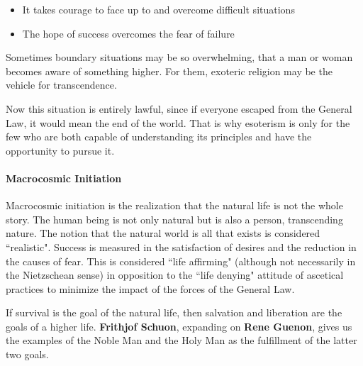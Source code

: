 \begin{itemize}
\item It takes courage to face up to and overcome difficult situations 
\item The hope of success overcomes the fear of failure 
\end{itemize}
Sometimes boundary situations may be so overwhelming, that a man or woman becomes aware of something higher. For them, exoteric religion may be the vehicle for transcendence.

Now this situation is entirely lawful, since if everyone escaped from the General Law, it would mean the end of the world. That is why esoterism is only for the few who are both capable of understanding its principles and have the opportunity to pursue it.

\paragraph{Macrocosmic Initiation}
Macrocosmic initiation is the realization that the natural life is not the whole story. The human being is not only natural but is also a person, transcending nature. The notion that the natural world is all that exists is considered ``realistic". Success is measured in the satisfaction of desires and the reduction in the causes of fear. This is considered ``life affirming" (although not necessarily in the Nietzschean sense) in opposition to the ``life denying" attitude of ascetical practices to minimize the impact of the forces of the General Law.

If survival is the goal of the natural life, then salvation and liberation are the goals of a higher life. \textbf{Frithjof Schuon}, expanding on \textbf{Rene Guenon}, gives us the examples of the Noble Man and the Holy Man as the fulfillment of the latter two goals.

